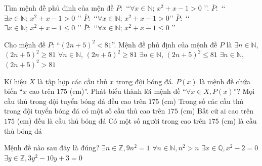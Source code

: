 \begin{ex}%
	Tìm mệnh đề phủ định của mện đề  $P \colon$ \lq\lq $\forall x \in \mathbb{N}; \, x^2+x-1>0$ \rq\rq.
	 \choice
		{$\overline{P} \colon$  \lq\lq $\exists x \in \mathbb{N}; \, x^2 + x - 1>0$ \rq\rq}
		{$\overline{P} \colon$ \lq\lq  $\forall x \in \mathbb{N}; \, x^2 + x - 1>0$\rq\rq}
		{\True  $\overline{P} \colon$ \lq\lq $\exists x \in \mathbb{N}; \, x^2 + x - 1 \le 0$ \rq\rq}
		{$\overline{P} \colon$ \lq\lq$ \forall x \in \mathbb{N}; \, x^2  + x - 1 \le 0$ \rq\rq}
\end{ex}

\begin{ex}%
	Cho mệnh đề $P$: “$\left(2n+5\right)^2<  81$”. Mệnh đề phủ định của mệnh đề $P$ là
	 \choice
		{\True $\exists n \in \mathbb{N}$,  $\left(2n+5\right)^2\ge 81$}
		{$\forall n \in \mathbb{N}$, $\left(2n+5\right)^2\ge  81$}
		{$\exists n \in \mathbb{N}$, $\left(2n+5\right)^2\le 81$} 
		{$\exists  n \in \mathbb{N}$, $\left(2n+5\right)^2> 81$}
\end{ex}

\begin{ex}%
	Kí hiệu $X$ là tập  hợp các cầu thủ $x$ trong đội bóng đá. $P(x)$ là mệnh đề chứa biến ``$x$ cao trên $175$ (cm)''. Phát biểu thành lời mệnh đề ``$
	 \forall x\in X, P(x)$''?
	 \choice
		{\True Mọi cầu thủ trong  đội tuyển bóng đá đều cao trên $175$ (cm)}
		{Trong số các cầu thủ trong đội tuyển bóng đá có một số  cầu thủ cao trên $175$ (cm)}
		{Bất cứ ai cao trên $175$  (cm) đều là cầu thủ bóng đá}
		{Có một số người trong cao trên $175$ (cm) là  cầu thủ bóng đá}
\end{ex}

\begin{ex}%
	Mệnh đề nào sau  đây là đúng?
	\choice 
		{$\exists  n \in \mathbb{Z},9n^2=1$}
		{$\forall n  \in \mathbb{N},n^2>n$}
		{$\exists  x \in \mathbb{Q},x^2-2=0$}
		{\True  $\exists y \in \mathbb{Z},3y^2-10y+3=0$}
\end{ex}

